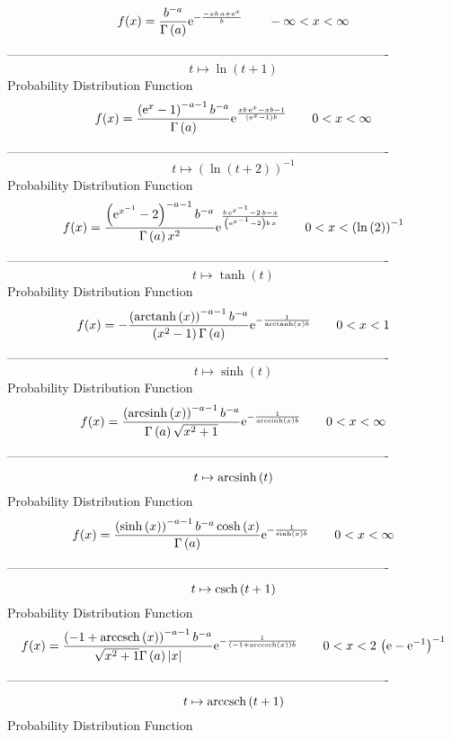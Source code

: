 \documentclass[12pt]{article}
\begin{document}
$$  f(x)={\frac {{b}^{-a}}{\Gamma \left( a \right) }{{\rm e}^{-{\frac {-xb\,a+{
{\rm e}^{x}}}{b}}}}}
 \qquad-\infty 
 < x < \infty 
$$-------------------------------------------------------------------------------------------  \\$$t\mapsto \ln  \left( t+1 \right) 
$$Probability Distribution Function 
$$  f(x)={\frac { \left( {{\rm e}^{x}}-1 \right) ^{-a-1}{b}^{-a}}{\Gamma
 \left( a \right) }{{\rm e}^{{\frac {xb\,{{\rm e}^{x}}-xb-1}{ \left( {
{\rm e}^{x}}-1 \right) b}}}}}
 \qquad0
 < x < \infty 
$$-------------------------------------------------------------------------------------------  \\$$t\mapsto  \left( \ln  \left( t+2 \right)  \right) ^{-1}
$$Probability Distribution Function 
$$  f(x)={\frac { \left( {{\rm e}^{{x}^{-1}}}-2 \right) ^{-a-1}{b}^{-a}}{\Gamma
 \left( a \right) {x}^{2}}{{\rm e}^{{\frac {b\,{{\rm e}^{{x}^{-1}}}-2
\,b-x}{ \left( {{\rm e}^{{x}^{-1}}}-2 \right) b\,x}}}}}
 \qquad0
 < x <  \left( \ln  \left( 2 \right)  \right) ^{-1}
$$-------------------------------------------------------------------------------------------  \\$$t\mapsto \tanh \left( t \right) 
$$Probability Distribution Function 
$$  f(x)=-{\frac { \left( {\rm arctanh} \left(x\right) \right) ^{-a-1}{b}^{-a}
}{ \left( {x}^{2}-1 \right) \Gamma \left( a \right) }{{\rm e}^{-{
\frac {1}{{\rm arctanh} \left(x\right)b}}}}}
 \qquad0
 < x < 1
$$-------------------------------------------------------------------------------------------  \\$$t\mapsto \sinh \left( t \right) 
$$Probability Distribution Function 
$$  f(x)={\frac { \left( {\rm arcsinh} \left(x\right) \right) ^{-a-1}{b}^{-a}}{
\Gamma \left( a \right) \sqrt {{x}^{2}+1}}{{\rm e}^{-{\frac {1}{
{\rm arcsinh} \left(x\right)b}}}}}
 \qquad0
 < x < \infty 
$$-------------------------------------------------------------------------------------------  \\$$t\mapsto {\rm arcsinh} \left(t\right)
$$Probability Distribution Function 
$$  f(x)={\frac { \left( \sinh \left( x \right)  \right) ^{-a-1}{b}^{-a}\cosh
 \left( x \right) }{\Gamma \left( a \right) }{{\rm e}^{-{\frac {1}{
\sinh \left( x \right) b}}}}}
 \qquad0
 < x < \infty 
$$-------------------------------------------------------------------------------------------  \\$$t\mapsto {\rm csch} \left(t+1\right)
$$Probability Distribution Function 
$$  f(x)={\frac { \left( -1+{\rm arccsch} \left(x\right) \right) ^{-a-1}{b}^{-a
}}{\sqrt {{x}^{2}+1}\Gamma \left( a \right)  \left| x \right| }{
{\rm e}^{-{\frac {1}{ \left( -1+{\rm arccsch} \left(x\right) \right) b
}}}}}
 \qquad0
 < x < 2\, \left( {\rm e}-{{\rm e}^{-1}} \right) ^{-1}
$$-------------------------------------------------------------------------------------------  \\$$t\mapsto {\rm arccsch} \left(t+1\right)
$$Probability Distribution Function 
\end{document}
